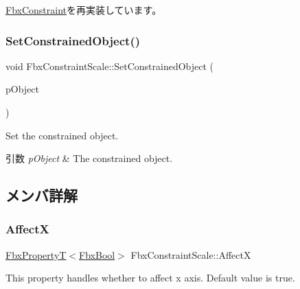 \hyperlink{class_fbx_constraint_adbeea66a1a605531a019aa6df90dc45b}{Fbx\+Constraint}を再実装しています。

\mbox{\label{class_fbx_constraint_scale_adf626a9273449dd4c74cf24f2a7bf5af}} 
\subsubsection{\texorpdfstring{Set\+Constrained\+Object()}{SetConstrainedObject()}}
{\footnotesize\ttfamily void Fbx\+Constraint\+Scale\+::\+Set\+Constrained\+Object (\begin{DoxyParamCaption}\item[{\hyperlink{class_fbx_object}{Fbx\+Object} $\ast$}]{p\+Object }\end{DoxyParamCaption})}

Set the constrained object. 
\begin{DoxyParams}{引数}
{\em p\+Object} & The constrained object. \\
\hline
\end{DoxyParams}


\subsection{メンバ詳解}
\mbox{\label{class_fbx_constraint_scale_a41d95ab4643d154a400efa926062ffac}} 
\subsubsection{\texorpdfstring{AffectX}{AffectX}}
{\footnotesize\ttfamily \hyperlink{class_fbx_property_t}{Fbx\+PropertyT}$<$\hyperlink{fbxtypes_8h_a92e0562b2fe33e76a242f498b362262e}{Fbx\+Bool}$>$ Fbx\+Constraint\+Scale\+::\+AffectX}

This property handles whether to affect x axis. Default value is true. \mbox{\label{class_fbx_constraint_scale_a2249bbb0bd5ba9507fa82e1b66c0b2a2}} 
